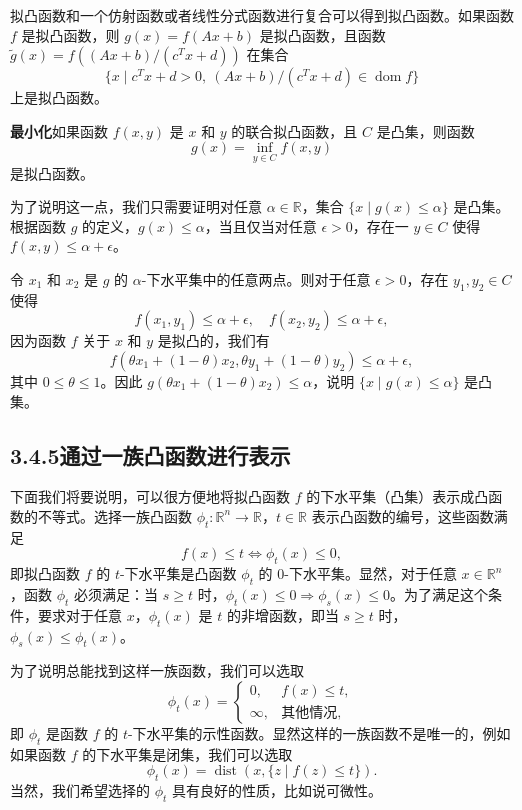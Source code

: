 \documentclass[UTF8,12pt,a4paper,fontset=fandol]{ctexart}
\DeclareMathOperator{\dom}{dom}
\begin{document}
拟凸函数和一个仿射函数或者线性分式函数进行复合可以得到拟凸函数。如果函数 $f$ 是拟凸函数，则 $g(x)=f(Ax+b)$ 是拟凸函数，且函数 $\tilde g(x)=f((Ax+b)/(c^Tx+d))$ 在集合
\[
\{x\mid c^Tx+d>0,\ (Ax+b)/(c^Tx+d)\in\dom f\}
\]
上是拟凸函数。

\noindent\textbf{最小化}\quad 如果函数 $f(x,y)$ 是 $x$ 和 $y$ 的联合拟凸函数，且 $C$ 是凸集，则函数
\[
g(x)=\inf_{y\in C}f(x,y)
\]
是拟凸函数。

为了说明这一点，我们只需要证明对任意 $\alpha\in\mathbb{R}$，集合 $\{x\mid g(x)\leq\alpha\}$ 是凸集。根据函数 $g$ 的定义，$g(x)\leq\alpha$，当且仅当对任意 $\epsilon>0$，存在一 $y\in C$ 使得 $f(x,y)\leq\alpha+\epsilon$。

令 $x_1$ 和 $x_2$ 是 $g$ 的 $\alpha$-下水平集中的任意两点。则对于任意 $\epsilon>0$，存在 $y_1,y_2\in C$ 使得
\[
f(x_1,y_1)\leq\alpha+\epsilon,\quad
f(x_2,y_2)\leq\alpha+\epsilon,
\]
因为函数 $f$ 关于 $x$ 和 $y$ 是拟凸的，我们有
\[
f(\theta x_1+(1-\theta)x_2,\theta y_1+(1-\theta)y_2)\leq\alpha+\epsilon,
\]
其中 $0\leq\theta\leq1$。因此 $g(\theta x_1+(1-\theta)x_2)\leq\alpha$，说明 $\{x\mid g(x)\leq\alpha\}$ 是凸集。

\subsection*{3.4.5\quad 通过一族凸函数进行表示}

下面我们将要说明，可以很方便地将拟凸函数 $f$ 的下水平集（凸集）表示成凸函数的不等式。选择一族凸函数 $\phi_t:\mathbb{R}^n\to\mathbb{R}$，$t\in\mathbb{R}$ 表示凸函数的编号，这些函数满足
\begin{equation}
f(x)\leq t\Longleftrightarrow \phi_t(x)\leq0,
\tag{3.23}
\end{equation}
即拟凸函数 $f$ 的 $t$-下水平集是凸函数 $\phi_t$ 的 $0$-下水平集。显然，对于任意 $x\in\mathbb{R}^n$，函数 $\phi_t$ 必须满足：当 $s\geq t$ 时，$\phi_t(x)\leq0\Longrightarrow\phi_s(x)\leq0$。为了满足这个条件，要求对于任意 $x$，$\phi_t(x)$ 是 $t$ 的非增函数，即当 $s\geq t$ 时，$\phi_s(x)\leq\phi_t(x)$。

为了说明总能找到这样一族函数，我们可以选取
\[
\phi_t(x)=
\begin{cases}
0, & f(x)\leq t,\\
\infty, & \text{其他情况},
\end{cases}
\]
即 $\phi_t$ 是函数 $f$ 的 $t$-下水平集的示性函数。显然这样的一族函数不是唯一的，例如如果函数 $f$ 的下水平集是闭集，我们可以选取
\[
\phi_t(x)=\operatorname{dist}(x,\{z\mid f(z)\leq t\}).
\]
当然，我们希望选择的 $\phi_t$ 具有良好的性质，比如说可微性。
\end{document}
